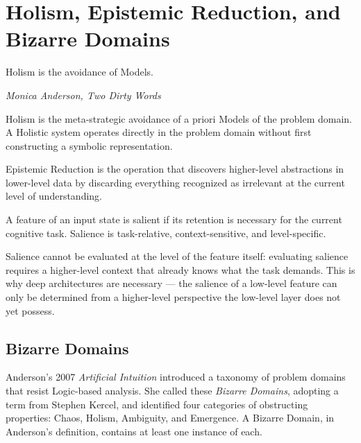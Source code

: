 \documentclass[12pt, a4paper, oneside]{book}
\begin{document}
\chapter{Holism, Epistemic Reduction, and Bizarre Domains}
\label{ch:holism}

\epigraph{%
  Holism is the avoidance of Models.%
}{\textit{Monica Anderson, \emph{Two Dirty Words}}}

\begin{definition}
Holism is the meta-strategic avoidance of a priori Models of the problem
domain. A Holistic system operates directly in the problem domain without
first constructing a symbolic representation.
\end{definition}

\begin{definition}
Epistemic Reduction is the operation that discovers higher-level
abstractions in lower-level data by discarding everything recognized as
irrelevant at the current level of understanding.
\end{definition}

\begin{definition}
A feature of an input state is salient if its retention is necessary for
the current cognitive task. Salience is task-relative, context-sensitive,
and level-specific.
\end{definition}

Salience cannot be evaluated at the level of the feature itself:
evaluating salience requires a higher-level context that already knows
what the task demands. This is why deep architectures are necessary ---
the salience of a low-level feature can only be determined from a
higher-level perspective the low-level layer does not yet possess.

\section{Bizarre Domains}

Anderson's 2007 \emph{Artificial Intuition} introduced a taxonomy of
problem domains that resist Logic-based analysis. She called these
\emph{Bizarre Domains}, adopting a term from Stephen Kercel, and
identified four categories of obstructing properties: Chaos, Holism,
Ambiguity, and Emergence. A Bizarre Domain, in Anderson's definition,
contains at least one instance of each.
\end{document}
